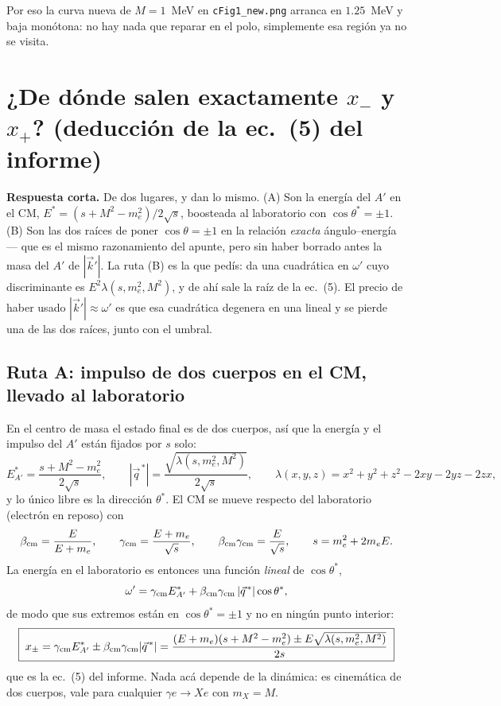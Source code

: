\documentclass[11pt,a4paper]{article}
\newcommand{\Ap}{A'}
\newcommand{\wpr}{\omega'}
\begin{document}
Por eso la curva nueva de $M=1$~MeV en \texttt{cFig1\_new.png} arranca en $1.25$~MeV y baja monótona: no hay nada que
reparar en el polo, simplemente esa región ya no se visita.


\section{¿De dónde salen exactamente \texorpdfstring{$x_-$}{x-} y \texorpdfstring{$x_+$}{x+}? (deducción de la ec.~(5) del informe)}

\noindent\textbf{Respuesta corta.} De dos lugares, y dan lo mismo. (A) Son la energía del $\Ap$ en el CM,
$E^*=(s+M^2-m_e^2)/2\sqrt s$, boosteada al laboratorio con $\cos\theta^*=\pm1$. (B) Son las dos raíces de poner
$\cos\theta=\pm1$ en la relación \emph{exacta} ángulo--energía --- que es el mismo razonamiento del apunte, pero sin
haber borrado antes la masa del $\Ap$ de $|\vec k'|$. La ruta (B) es la que pedís: da una cuadrática en $\wpr$ cuyo
discriminante es $E^2\lambda(s,m_e^2,M^2)$, y de ahí sale la raíz de la ec.~(5). El precio de haber usado
$|\vec k'|\approx\wpr$ es que esa cuadrática degenera en una lineal y se pierde una de las dos raíces, junto con el
umbral.

\subsection{Ruta A: impulso de dos cuerpos en el CM, llevado al laboratorio}
En el centro de masa el estado final es de dos cuerpos, así que la energía y el impulso del $\Ap$ están fijados por
$s$ solo:
\begin{equation}
E^*_{\Ap}=\frac{s+M^2-m_e^2}{2\sqrt s},\qquad
|\vec q^{\,*}|=\frac{\sqrt{\lambda(s,m_e^2,M^2)}}{2\sqrt s},\qquad
\lambda(x,y,z)=x^2+y^2+z^2-2xy-2yz-2zx,
\end{equation}
y lo único libre es la dirección $\theta^*$. El CM se mueve respecto del laboratorio (electrón en reposo) con
\begin{equation}
\beta_{\rm cm}=\frac{E}{E+m_e},\qquad
\gamma_{\rm cm}=\frac{E+m_e}{\sqrt s},\qquad
\beta_{\rm cm}\gamma_{\rm cm}=\frac{E}{\sqrt s},\qquad s=m_e^2+2m_eE .
\end{equation}
La energía en el laboratorio es entonces una función \emph{lineal} de $\cos\theta^*$,
\begin{equation}
\wpr=\gamma_{\rm cm}E^*_{\Ap}+\beta_{\rm cm}\gamma_{\rm cm}\,|\vec q^{\,*}|\cos\theta^* ,
\end{equation}
de modo que sus extremos están en $\cos\theta^*=\pm1$ y no en ningún punto interior:
\begin{equation}
\boxed{\;x_\pm=\gamma_{\rm cm}E^*_{\Ap}\pm\beta_{\rm cm}\gamma_{\rm cm}|\vec q^{\,*}|
=\frac{(E+m_e)(s+M^2-m_e^2)\pm E\sqrt{\lambda(s,m_e^2,M^2)}}{2s}\;}
\label{eq:xpm}
\end{equation}
que es la ec.~(5) del informe. Nada acá depende de la dinámica: es cinemática de dos cuerpos, vale para cualquier
$\gamma e\to Xe$ con $m_X=M$.
\end{document}
